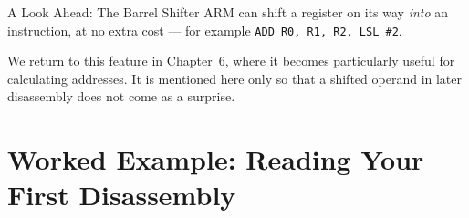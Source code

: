 \documentclass[9pt,aspectratio=169,xcolor=table]{beamer}
\begin{document}
\begin{frame}{A Look Ahead: The Barrel Shifter}
    \leavevmode
    {\small ARM can shift a register on its way \emph{into} an
    instruction, at no extra cost --- for example
    \texttt{ADD R0, R1, R2, LSL \#2}.}

    \vspace{3mm}
    {\small We return to this feature in Chapter~6, where it becomes
    particularly useful for calculating addresses. It is mentioned here
    only so that a shifted operand in later disassembly does not come as
    a surprise.}
\end{frame}


\section{Worked Example: Reading Your First Disassembly}
\end{document}
